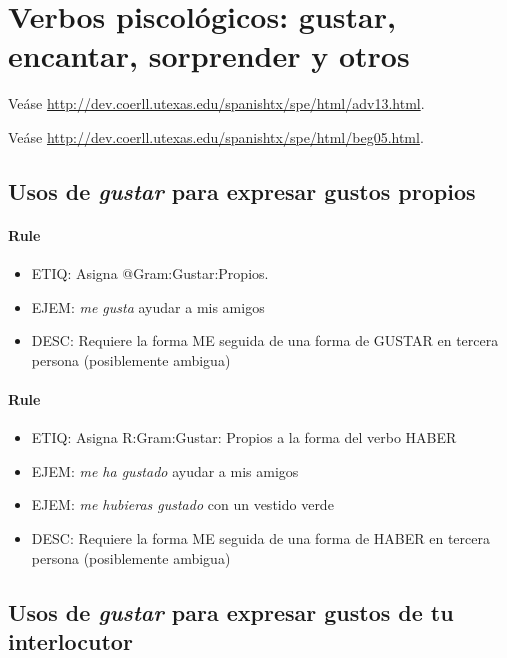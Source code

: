 \documentclass[11pt]{report}
\begin{document}
\section{Verbos piscológicos: gustar, encantar, sorprender y otros}
Veáse \url{http://dev.coerll.utexas.edu/spanishtx/spe/html/adv13.html}.

Veáse \url{http://dev.coerll.utexas.edu/spanishtx/spe/html/beg05.html}.

\subsection{Usos de \emph{gustar} para expresar gustos propios}
\paragraph*{Rule}
\begin{itemize}
\item ETIQ: Asigna @Gram:Gustar:Propios.
\item EJEM: \emph{me gusta} ayudar a mis amigos 
\item DESC: Requiere la forma ME seguida de una forma de GUSTAR en tercera persona (posiblemente ambigua)
\end{itemize}

\paragraph*{Rule}
\begin{itemize}
\item ETIQ: Asigna R:Gram:Gustar: Propios a la forma del verbo HABER
\item EJEM: \emph{me ha gustado} ayudar a mis amigos 
\item EJEM: \emph{me hubieras gustado} con un vestido verde 
\item DESC: Requiere la forma ME seguida de una forma de HABER en tercera persona (posiblemente ambigua)
\end{itemize}

\subsection{Usos de \emph{gustar} para expresar gustos de tu interlocutor}
\end{document}
